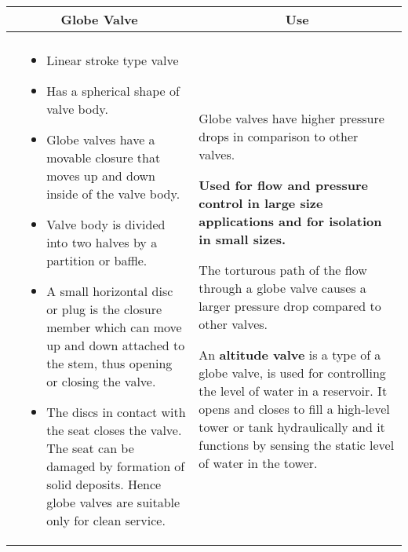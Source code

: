 \begin{landscape}
\begin{table}
  \centering
  \begin{tabular}{| m{7cm} m{10cm} | m{7cm} | }
    \hline
\multicolumn{2}{c}{Globe Valve} & \multicolumn{1}{c}{Use} \\ \hline
    \begin{minipage}{.5\textwidth}
    \begin{center}
    \hspace{0.5cm}
     \texttt{[image: GlobeValve1]}\\
     \end{center}
    \end{minipage}
    &
  \scriptsize{\begin{itemize}[topsep=5pt, partopsep=0pt]
  \item Linear stroke type valve \item Has a spherical shape of valve body. \item Globe valves have a movable closure that moves up and down inside of the valve body. \item Valve body is divided into two halves by a partition or baffle.  \item A small horizontal disc or plug is the closure member which can move up and down attached to the stem, thus opening or closing the valve. \item The discs in contact with the seat closes the valve. The seat can be damaged by formation of solid deposits. Hence globe valves are suitable only for clean service.
  \end{itemize}}  
    &
        \vspace{0.4cm}
      \begin{itemize}[leftmargin=*]
      \scriptsize{
       \item Globe valves have higher pressure drops in comparison to other valves.
        \item \textbf{Used for flow and pressure control in large size applications and for isolation in small sizes.  }
        \item The torturous path of the flow through a globe valve causes a larger pressure drop compared to other valves. 
        \item An \textbf{altitude valve} is a type of a globe valve, is used for controlling the level of water in a reservoir.  It opens and closes to fill a high-level tower or tank hydraulically and it functions by sensing the static level of water in the tower.}
      \end{itemize}
  

\end{tabular}
\end{table}
\end{landscape}
